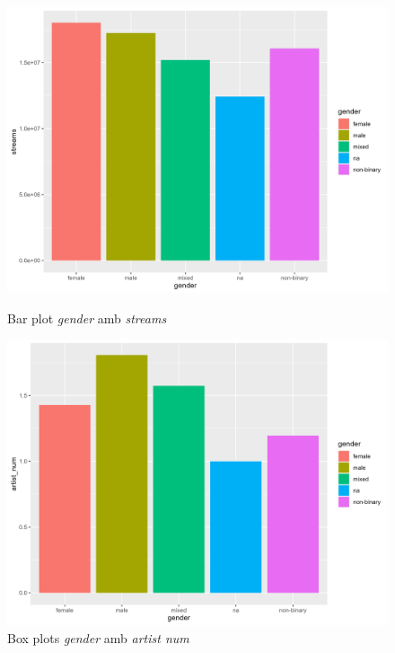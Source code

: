 \begin{figure}[H]
\centering
    \begin{minipage}{.4\textwidth}
        \centering
        \includegraphics[width=0.95\linewidth]{Images/2_Bivariate/genderstreams.png}
        \caption{Bar plot \textit{gender} amb \textit{streams}}
        \label{fig:BivariateR_genderstreams}
    \end{minipage}%
    \begin{minipage}{.4\textwidth}
        \centering
        \includegraphics[width=0.95\linewidth]{Images/2_Bivariate/gendernum.png}
        \caption{Box plots \textit{gender} amb \textit{artist num}}
        \label{fig:BivariateR_gendernum}
    \end{minipage}%
\end{figure}

